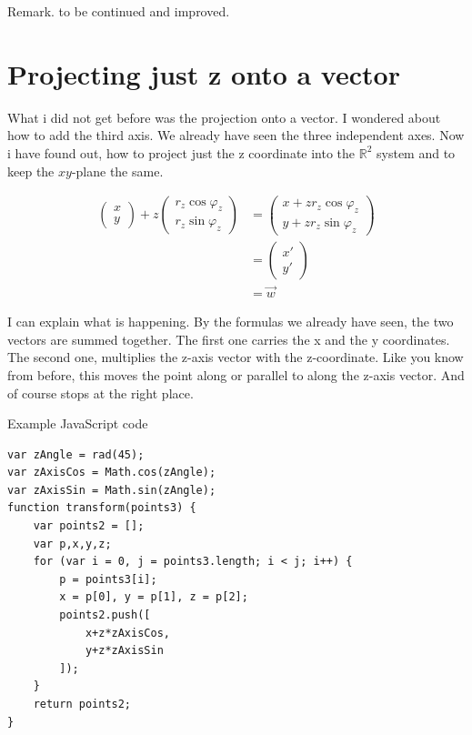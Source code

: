 \documentclass[a4paper]{article}
\begin{document}
\begin{Example}
Remark. to be continued and improved.


\section{Projecting just z onto a vector}

\label{projecting_just_z}
What i did not get before was the projection onto a vector. I wondered about how to add the third axis. We already have seen the three independent axes. Now i have found out, how to project just the z coordinate into the $\mathbb{R}^{2}$ system and to keep the $xy$-plane the same. 

\begin{displaymath}
\begin{align}
\begin{pmatrix}x\\y\end{pmatrix} + z\begin{pmatrix}r_z\cos\varphi_z\\r_z\sin\varphi_z\end{pmatrix} &= \begin{pmatrix}x+zr_{z}\cos\varphi_z\\y+zr_{z}\sin\varphi_z\end{pmatrix}\\ &= \begin{pmatrix}x'\\y'\end{pmatrix}\\ &= \vec{w}
\end{align}
\end{displaymath}

I can explain what is happening. By the formulas we already have seen, the two vectors are summed together. The first one carries the x and the y coordinates. The second one, multiplies the z-axis vector with the z-coordinate. Like you know from before, this moves the point along or parallel to along the z-axis vector. And of course stops at the right place.


\begin{example}
Example JavaScript code
\begin{lstlisting}
var zAngle = rad(45);
var zAxisCos = Math.cos(zAngle);
var zAxisSin = Math.sin(zAngle);
function transform(points3) {
    var points2 = [];
    var p,x,y,z;
    for (var i = 0, j = points3.length; i < j; i++) {
        p = points3[i];
        x = p[0], y = p[1], z = p[2];
        points2.push([
            x+z*zAxisCos,
            y+z*zAxisSin
        ]);
    }
    return points2;
}
\end{lstlisting}
\end{example}


\end{Example}
\end{document}
